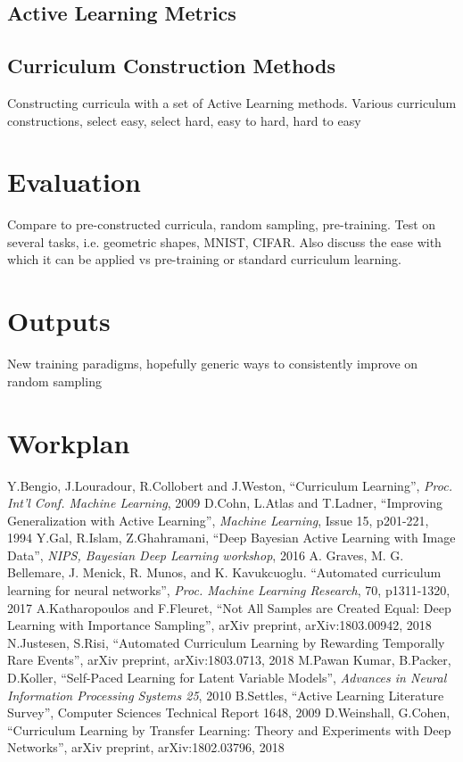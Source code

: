 \documentclass[a4paper,11pt]{article}
\begin{document}
\subsection{Active Learning Metrics}

\subsection{Curriculum Construction Methods}


Constructing curricula with a set of Active Learning methods. 
Various curriculum constructions, select easy, select hard, easy to hard, hard to easy

\section{Evaluation}
Compare to pre-constructed curricula, random sampling, pre-training.
Test on several tasks, i.e. geometric shapes, MNIST, CIFAR.
Also discuss the ease with which it can be applied vs pre-training or standard curriculum learning.

\section{Outputs}
New training paradigms, hopefully generic ways to consistently improve on random sampling

\section{Workplan}


\begin{thebibliography}{1}
Y.Bengio, J.Louradour, R.Collobert and J.Weston, ``Curriculum Learning'', \textit{Proc. Int'l Conf. Machine Learning}, 2009
D.Cohn, L.Atlas and T.Ladner, ``Improving Generalization with Active Learning'', \textit{Machine Learning}, Issue 15, p201-221, 1994
Y.Gal, R.Islam, Z.Ghahramani, ``Deep Bayesian Active Learning with Image Data'', \textit{NIPS, Bayesian Deep Learning workshop}, 2016
A. Graves, M. G. Bellemare, J. Menick, R. Munos, and K. Kavukcuoglu. ``Automated curriculum learning for neural networks'', \textit{Proc. Machine Learning Research}, 70, p1311-1320, 2017
A.Katharopoulos and F.Fleuret, ``Not All Samples are Created Equal: Deep Learning with Importance Sampling'', arXiv preprint, arXiv:1803.00942, 2018
N.Justesen, S.Risi, ``Automated Curriculum Learning by Rewarding Temporally Rare Events'', arXiv preprint, arXiv:1803.0713, 2018
M.Pawan Kumar, B.Packer, D.Koller, ``Self-Paced Learning for Latent Variable Models'', \textit{Advances in Neural Information Processing Systems 25}, 2010
B.Settles, ``Active Learning Literature Survey'', Computer Sciences Technical Report 1648, 2009
D.Weinshall, G.Cohen, ``Curriculum Learning by Transfer Learning: Theory and Experiments with Deep Networks'', arXiv preprint, arXiv:1802.03796, 2018

\end{thebibliography}
\end{document}
